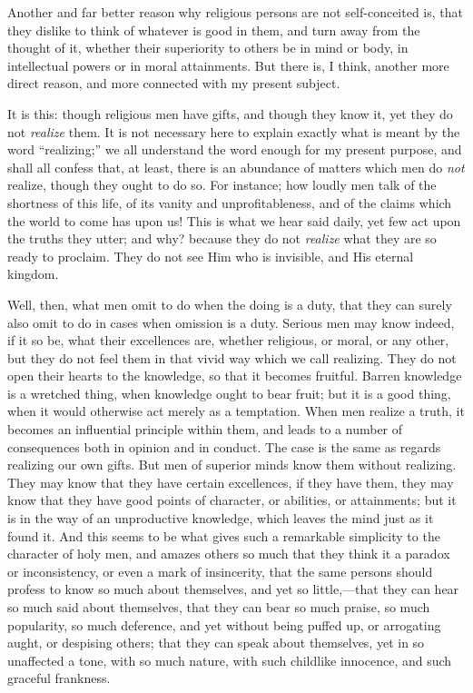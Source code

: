 Another and far better reason why religious persons are not
self-conceited is, that they dislike to think of whatever is good in
them, and turn away from the thought of it, whether their superiority
to others be in mind or body, in intellectual powers or in moral
attainments. But there is, I think, another more direct reason, and
more connected with my present subject.

It is this: though religious men have gifts, and though they know
it, yet they do not \emph{realize} them. It is not necessary here to
explain exactly what is meant by the word ``realizing;'' we
all understand the word enough for my present purpose, and shall all
confess that, at least, there is an abundance of matters which men do \emph{not}
realize, though they ought to do so. For instance; how loudly men talk
of the shortness of this life, of its vanity and unprofitableness, and
of the claims which the world to come has upon us! This is what we
hear said daily, yet few act upon the truths they utter; and why?
because they do not \emph{realize} what they are so ready to proclaim.
They do not see Him who is invisible, and His eternal kingdom.

Well, then, what men omit to do when the doing is a duty, that they
can surely also omit to do in cases when omission is a duty. Serious
men may know indeed, if it so be, what their excellences are, whether
religious, or moral, or any other, but they do not feel them in that
vivid way which we call realizing. They do not open their hearts to
the knowledge, so that it becomes fruitful. Barren knowledge is a
wretched thing, when knowledge ought to bear fruit; but it is a good
thing, when it would otherwise act merely as a temptation. When men
realize a truth, it becomes an influential principle within them, and
leads to a number of consequences both in opinion and in conduct. The
case is the same as regards realizing our own gifts. But men of
superior minds know them without realizing. They may know that they
have certain excellences, if they have them, they may know that they
have good points of character, or abilities, or attainments; but it is
in the way of an unproductive knowledge, which leaves the mind just as
it found it. And this seems to be what gives such a remarkable
simplicity to the character of holy men, and amazes others so much
that they think it a paradox or inconsistency, or even a mark of
insincerity, that the same persons should profess to know so much
about themselves, and yet so little,—that they can hear so much said
about themselves, that they can bear so much praise, so much
popularity, so much deference, and yet without being puffed up, or
arrogating aught, or despising others; that they can speak about
themselves, yet in so unaffected a tone, with so much nature, with
such childlike innocence, and such graceful frankness.

